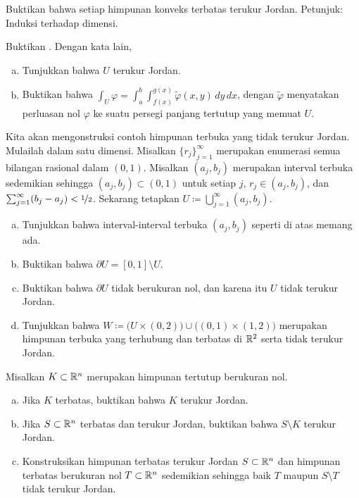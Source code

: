 \begin{exercise}
Buktikan bahwa setiap himpunan konveks terbatas terukur Jordan.  Petunjuk:
Induksi terhadap dimensi.
\end{exercise}

\begin{exercise} \label{exercise:intovertypeIset}
Buktikan .  Dengan kata lain,
\begin{enumerate}[a)]
\item
Tunjukkan bahwa $U$ terukur Jordan.
\item
Buktikan bahwa
$\int_U \varphi =
\int_a^b \int_{f(x)}^{g(x)} \widetilde{\varphi}(x,y) \, dy \, dx$,
dengan $\widetilde{\varphi}$ menyatakan perluasan nol $\varphi$ ke suatu
persegi panjang tertutup yang memuat $U$.
\end{enumerate}
\end{exercise}

\begin{exercise}
Kita akan mengonstruksi contoh himpunan terbuka yang tidak terukur Jordan.
Mulailah dalam satu dimensi.  Misalkan $\{ r_j \}_{j=1}^\infty$ merupakan enumerasi
semua bilangan rasional dalam $(0,1)$.  Misalkan $(a_j,b_j)$ merupakan interval terbuka
sedemikian sehingga $(a_j,b_j) \subset (0,1)$ untuk setiap $j$, $r_j \in (a_j,b_j)$,
dan $\sum_{j=1}^\infty (b_j-a_j) < \nicefrac{1}{2}$.  Sekarang tetapkan $U \coloneqq
\bigcup_{j=1}^\infty (a_j,b_j)$.
\begin{enumerate}[a)]
\item
Tunjukkan bahwa interval-interval terbuka $(a_j,b_j)$ seperti di atas memang ada.
\item
Buktikan bahwa $\partial U = [0,1] \setminus U$.
\item
Buktikan bahwa $\partial U$ tidak berukuran nol, dan karena itu $U$ tidak terukur Jordan.
\item
Tunjukkan bahwa $W \coloneqq
\bigl( U \times (0,2) \bigr) \cup \bigl( (0,1) \times (1,2) \bigr)$
merupakan himpunan terbuka yang terhubung dan terbatas di ${\mathbb{R}}^2$
serta tidak terukur Jordan.
\end{enumerate}
\end{exercise}

\begin{exercise}
Misalkan $K \subset {\mathbb{R}}^n$ merupakan himpunan tertutup berukuran nol.
\begin{enumerate}[a)]
\item
Jika $K$ terbatas, buktikan bahwa $K$ terukur Jordan.
\item
Jika $S \subset {\mathbb{R}}^n$ terbatas dan terukur Jordan, buktikan bahwa
$S \setminus K$ terukur Jordan.
\item
Konstruksikan himpunan terbatas terukur Jordan $S \subset {\mathbb{R}}^n$
dan himpunan terbatas berukuran nol $T \subset {\mathbb{R}}^n$ sedemikian sehingga
baik $T$ maupun $S \setminus T$ tidak terukur Jordan.
\end{enumerate}
\end{exercise}

